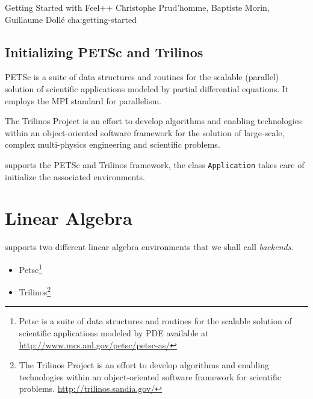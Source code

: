             {Getting Started with Feel++}
            {Christophe Prud'homme, Baptiste Morin, Guillaume Dollé}
            {cha:getting-started}





\subsection{Initializing PETSc and Trilinos}


PETSc is a suite of data structures and routines for the scalable (parallel)
solution of scientific applications modeled by partial differential
equations. It employs the MPI standard for parallelism.

The Trilinos Project is an effort to develop algorithms and enabling
technologies within an object-oriented software framework for the solution of
large-scale, complex multi-physics engineering and scientific problems.

\feel supports the PETSc and Trilinos framework, the class
\lstinline!Application! takes care of initialize the
associated environments.









\section{Linear Algebra}
\label{sec:linear-algebra}

\feel supports two different linear algebra environments that we
shall call \emph{backends}.
\begin{itemize}
\item Petsc\footnote{Petsc is a suite of data structures and routines for the scalable solution of scientific applications modeled by PDE available at \url{http://www.mcs.anl.gov/petsc/petsc-as/}}
\item Trilinos\footnote{The Trilinos Project is an effort to develop algorithms and enabling technologies within an object-oriented software framework for scientific problems. \url{http://trilinos.sandia.gov/}}
\end{itemize}


